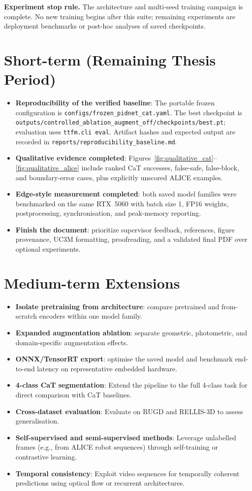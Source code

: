 \documentclass[12pt,a4paper]{report}
\begin{document}
\noindent\textbf{Experiment stop rule.}
The architecture and multi-seed training campaign is complete. No new training
begins after this suite; remaining experiments are deployment benchmarks or
post-hoc analyses of saved checkpoints.

\section{Short-term (Remaining Thesis Period)}
\begin{itemize}[nosep]
  \item \textbf{Reproducibility of the verified baseline}: The portable frozen
  configuration is \texttt{configs/frozen\_pidnet\_cat.yaml}. The best
  checkpoint is \texttt{outputs/controlled\_ablation\_augment\_off/checkpoints/best.pt};
  evaluation uses \texttt{ttfm.cli eval}. Artifact hashes and expected output
  are recorded in \texttt{reports/reproducibility\_baseline.md}.
  \item \textbf{Qualitative evidence completed}: Figures~\ref{fig:qualitative_cat}--\ref{fig:qualitative_alice}
  include ranked CaT successes, false-safe, false-block, and boundary-error
  cases, plus explicitly unscored ALICE examples.
  \item \textbf{Edge-style measurement completed}: both saved model families
  were benchmarked on the same RTX~5060 with batch size 1, FP16 weights,
  postprocessing, synchronisation, and peak-memory reporting.
  \item \textbf{Finish the document}: prioritize supervisor feedback,
  references, figure provenance, UC3M formatting, proofreading, and a validated
  final PDF over optional experiments.
\end{itemize}

\section{Medium-term Extensions}
\begin{itemize}[nosep]
  \item \textbf{Isolate pretraining from architecture}: compare pretrained and
  from-scratch encoders within one model family.
  \item \textbf{Expanded augmentation ablation}: separate geometric,
  photometric, and domain-specific augmentation effects.
  \item \textbf{ONNX/TensorRT export}: optimise the saved model and benchmark
  end-to-end latency on representative embedded hardware.
  \item \textbf{4-class CaT segmentation}: Extend the pipeline to the full 4-class task for direct comparison with CaT baselines.
  \item \textbf{Cross-dataset evaluation}: Evaluate on RUGD and RELLIS-3D to assess generalisation.
  \item \textbf{Self-supervised and semi-supervised methods}: Leverage unlabelled frames (e.g., from ALICE robot sequences) through self-training or contrastive learning.
  \item \textbf{Temporal consistency}: Exploit video sequences for temporally coherent predictions using optical flow or recurrent architectures.
\end{itemize}
\end{document}
